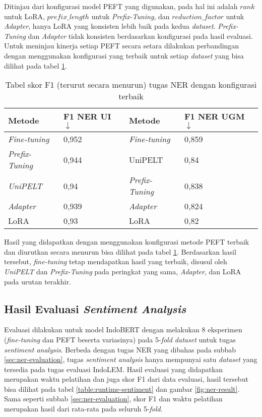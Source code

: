 Ditinjau dari konfigurasi model PEFT yang digunakan, pada hal ini adalah $rank$ untuk LoRA, $prefix\_length$ untuk \textit{Prefix-Tuning}, dan $reduction\_factor$ untuk \textit{Adapter}, hanya LoRA yang konsisten lebih baik pada kedua \textit{dataset}. \textit{Prefix-Tuning} dan \textit{Adapter} tidak konsisten berdasarkan konfigurasi pada hasil evaluasi. Untuk meninjau kinerja setiap PEFT secara setara dilakukan perbandingan dengan menggunakan konfigurasi yang terbaik untuk setiap \textit{dataset} yang bisa dilihat pada tabel \ref{table:ner-result-desc}.

\begin{table}[h]
    \centering
    \caption{Tabel skor F1 (terurut secara menurun) tugas NER dengan konfigurasi terbaik}
    \label{table:ner-result-desc}
    \begin{tabular}{ll|ll}
        \toprule
        \textbf{Metode} & \textbf{F1 NER UI $\downarrow$} & \textbf{Metode} & \textbf{F1 NER UGM $\downarrow$} \\
        \midrule
        \textit{Fine-tuning} & 0,952 & \textit{Fine-tuning} & 0,859 \\
        \textit{Prefix-Tuning} & 0,944 & UniPELT & 0,84 \\
        \textit{UniPELT} & 0,94 & \textit{Prefix-Tuning} & 0,838 \\
        \textit{Adapter} & 0,939 & \textit{Adapter} & 0,824 \\
        LoRA & 0,93 & LoRA & 0,82 \\
        \bottomrule
    \end{tabular}
\end{table}

Hasil yang didapatkan dengan menggunakan konfigurasi metode PEFT terbaik dan diurutkan secara menurun bisa dilihat pada tabel \ref{table:ner-result-desc}. Berdasarkan hasil tersebut, \textit{fine-tuning} tetap mendapatkan hasil yang terbaik, disusul oleh \textit{UniPELT} dan \textit{Prefix-Tuning} pada peringkat yang sama, \textit{Adapter}, dan LoRA pada urutan terakhir.

\subsection{Hasil Evaluasi \textit{Sentiment Analysis}}
\label{sec:sentiment-evaluation}

Evaluasi dilakukan untuk model IndoBERT dengan melakukan 8 eksperimen (\textit{fine-tuning} dan PEFT beserta variasinya) pada 5-\textit{fold dataset} untuk tugas \textit{sentiment analysis}. Berbeda dengan tugas NER yang dibahas pada subbab \ref{sec:ner-evaluation}, tugas \textit{sentiment analysis} hanya mempunyai satu \textit{dataset} yang tersedia pada tugas evaluasi IndoLEM. Hasil evaluasi yang didapatkan merupakan waktu pelatihan dan juga skor F1 dari data evaluasi, hasil tersebut bisa dilihat pada tabel \ref{table:runtime-sentiment} dan gambar \ref{fig:ner-result}. Sama seperti subbab \ref{sec:ner-evaluation}, skor F1 dan waktu pelatihan merupakan hasil dari rata-rata pada seluruh 5-\textit{fold}.

